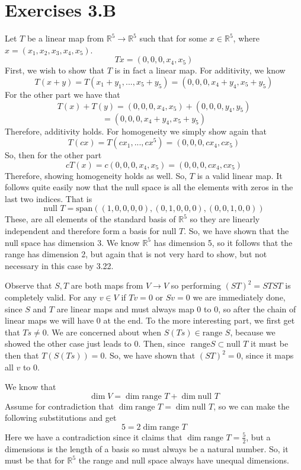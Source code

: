\documentclass[10pt, twocolumn]{article}
\newcommand{\R}{\mathbb{R}}
\newcommand{\vspan}[1]{\text{span}\left(#1\right)}
\newcommand{\nul}{\text{null }}
\newcommand{\range}{\text{range }}
\begin{document}
\section{Exercises 3.B}
\begin{q}[1]
	Let $ T $ be a linear map from $ \R^5 \to \R^5 $ such that for some $ x \in \R^5 $, 
	where $ x = (x_1, x_2, x_3, x_4, x_5) $.
	$$ Tx = (0, 0, 0, x_4, x_5) $$
	First, we wish to show that $ T $ is in fact a linear map. 
	For additivity, we know 
	$$ T(x + y) = T(x_1 + y_1, ..., x_5 + y_5) = (0, 0, 0, x_4 + y_4, x_5 + y_5)$$
	For the other part we have that 
	$$ T(x) + T(y) = (0, 0, 0, x_4, x_5) + (0, 0, 0, y_4, y_5) $$ 
	$$ = (0, 0, 0, x_4 + y_4, x_5 + y_5) $$
	Therefore, additivity holds.
	For homogeneity we simply show again that 
	$$ T(cx) = T(cx_1, ..., cx^5) = (0, 0, 0, cx_4, cx_5) $$
	So, then for the other part
	$$ cT(x) = c (0, 0, 0, x_4, x_5) =(0, 0, 0, cx_4, cx_5) $$
	Therefore, showing homogeneity holds as well. 
	So, $ T $ is a valid linear map.
	It follows quite easily now that the null space is all the elements with zeros in the last two indices. 
	That is $$ \nul T = \vspan{(1, 0, 0, 0, 0 ), (0, 1, 0, 0, 0), (0, 0, 1, 0, 0)} $$ 
	These, are all elements of the standard basis of $ \R^5 $ so they are linearly independent and therefore form a basis for $ \nul T $.
	So, we have shown that the null space has dimension 3. We know $ \R^5 $ has dimension 5, so it follows that the range has dimension 2, 
	but again that is not very hard to show, but not necessary in this case by 3.22.
\end{q}
\begin{q}[2]
	Observe that $ S, T $ are both  maps from $ V \to V $ so performing $ (ST)^2 = STST $ is completely valid.
	For any $ v \in V $ if $ Tv = 0 $ or $ Sv = 0 $ we are immediately done, since $ S $ and $ T $ are linear maps and must always map 0 to 0, 
	so after the chain of linear maps we will have 0 at the end. 
	To the more interesting part, we first get that $ Ts \neq 0 $. 
	We are concerned about when $ S(Ts) \in \text{range } S$, because we showed the other case just leads to 0.
	Then, since $ \text{ range} S \subset \nul T $ it must be then that $ T(S(Ts)) = 0 $. 
	So, we have shown that $ (ST)^2 = 0 $, since it maps all $ v $ to 0. 
\end{q}
\begin{q}[5]

\end{q}
\begin{q}[6]
	We know that $$ \dim V = \dim \range	T + \dim \nul T $$
	Assume for contradiction that $ \dim \range	T = \dim \nul T $, 
	so we can make the following substitutions and get 
	$$ 5 = 2 \dim \range T $$
	Here we have a contradiction since it claims that $ \dim \range T = \frac{5}{2} $, 
	but a dimensions is the length of a basis so must always be a natural number. 
	So, it must be that for $ \R^5 $ the range and null space always have unequal dimensions.
\end{q}
\end{document}
